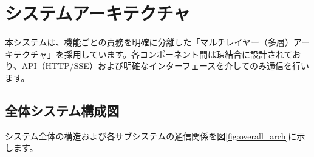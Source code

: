 \section{システムアーキテクチャ}

本システムは、機能ごとの責務を明確に分離した「マルチレイヤー（多層）アーキテクチャ」を採用しています。各コンポーネント間は疎結合に設計されており、API（HTTP/SSE）および明確なインターフェースを介してのみ通信を行います。

\subsection{全体システム構成図}

システム全体の構造および各サブシステムの通信関係を図\ref{fig:overall_arch}に示します。


